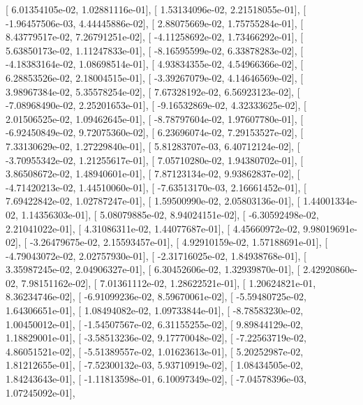 \documentclass{article}
\begin{document}
       [  6.01354105e-02,   1.02881116e-01],
       [  1.53134096e-02,   2.21518055e-01],
       [ -1.96457506e-03,   4.44445886e-02],
       [  2.88075669e-02,   1.75755284e-01],
       [  8.43779517e-02,   7.26791251e-02],
       [ -4.11258692e-02,   1.73466292e-01],
       [  5.63850173e-02,   1.11247833e-01],
       [ -8.16595599e-02,   6.33878283e-02],
       [ -4.18383164e-02,   1.08698514e-01],
       [  4.93834355e-02,   4.54966366e-02],
       [  6.28853526e-02,   2.18004515e-01],
       [ -3.39267079e-02,   4.14646569e-02],
       [  3.98967384e-02,   5.35578254e-02],
       [  7.67328192e-02,   6.56923123e-02],
       [ -7.08968490e-02,   2.25201653e-01],
       [ -9.16532869e-02,   4.32333625e-02],
       [  2.01506525e-02,   1.09462645e-01],
       [ -8.78797604e-02,   1.97607780e-01],
       [ -6.92450849e-02,   9.72075360e-02],
       [  6.23696074e-02,   7.29153527e-02],
       [  7.33130629e-02,   1.27229840e-01],
       [  5.81283707e-03,   6.40712124e-02],
       [ -3.70955342e-02,   1.21255617e-01],
       [  7.05710280e-02,   1.94380702e-01],
       [  3.86508672e-02,   1.48940601e-01],
       [  7.87123134e-02,   9.93862837e-02],
       [ -4.71420213e-02,   1.44510060e-01],
       [ -7.63513170e-03,   2.16661452e-01],
       [  7.69422842e-02,   1.02787247e-01],
       [  1.59500990e-02,   2.05803136e-01],
       [  1.44001334e-02,   1.14356303e-01],
       [  5.08079885e-02,   8.94024151e-02],
       [ -6.30592498e-02,   2.21041022e-01],
       [  4.31086311e-02,   1.44077687e-01],
       [  4.45660972e-02,   9.98019691e-02],
       [ -3.26479675e-02,   2.15593457e-01],
       [  4.92910159e-02,   1.57188691e-01],
       [ -4.79043072e-02,   2.02757930e-01],
       [ -2.31716025e-02,   1.84938768e-01],
       [  3.35987245e-02,   2.04906327e-01],
       [  6.30452606e-02,   1.32939870e-01],
       [  2.42920860e-02,   7.98151162e-02],
       [  7.01361112e-02,   1.28622521e-01],
       [  1.20624821e-01,   8.36234746e-02],
       [ -6.91099236e-02,   8.59670061e-02],
       [ -5.59480725e-02,   1.64306651e-01],
       [  1.08494082e-02,   1.09733844e-01],
       [ -8.78583230e-02,   1.00450012e-01],
       [ -1.54507567e-02,   6.31155255e-02],
       [  9.89844129e-02,   1.18829001e-01],
       [ -3.58513236e-02,   9.17770048e-02],
       [ -7.22563719e-02,   4.86051521e-02],
       [ -5.51389557e-02,   1.01623613e-01],
       [  5.20252987e-02,   1.81212655e-01],
       [ -7.52300132e-03,   5.93710919e-02],
       [  1.08434505e-02,   1.84243643e-01],
       [ -1.11813598e-01,   6.10097349e-02],
       [ -7.04578396e-03,   1.07245092e-01],
\end{document}
